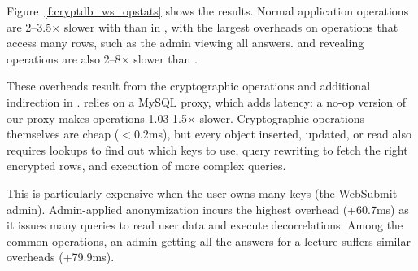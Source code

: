 %
Figure~\ref{f:cryptdb_ws_opstats} shows the results.
%
Normal application operations are 2--3.5$\times$ slower with \syscrypt than in
\sys, with the largest overheads on operations that access many rows, such as
the admin viewing all answers.
%
\Xxing and revealing operations are also 2--8$\times$ slower than \sys.
%

%
These overheads result from the cryptographic operations and additional
indirection in \syscrypt.
%
\syscrypt relies on a MySQL proxy, which adds latency: a no-op
version of our proxy makes operations 1.03-1.5$\times$ slower.
%
%
Cryptographic operations themselves are cheap ($<0.2$ms), but every object
inserted, updated, or read also requires lookups to find out which keys
to use, query rewriting to fetch the right encrypted rows, and
execution of more complex queries.
%

%
This is particularly expensive
when the user owns many keys (\eg the WebSubmit admin).
%
%
%
%
%
Admin-applied anonymization incurs the highest overhead (+60.7ms) as it issues
many queries to read user data and execute decorrelations.
%
Among the common operations,
an admin getting all the answers for a lecture
suffers similar overheads (+79.9ms).
%
%

